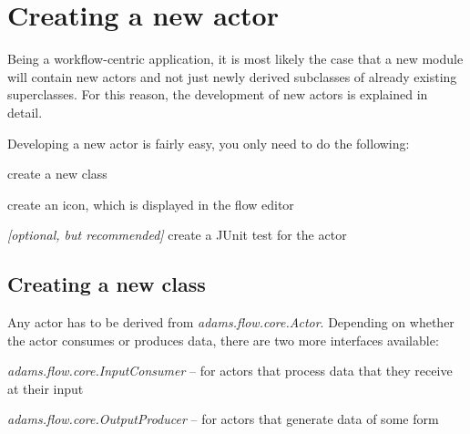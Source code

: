 \section{Creating a new actor}
Being a workflow-centric application, it is most likely the case that a new
module will contain new actors and not just newly derived subclasses of already
existing superclasses. For this reason, the development of new actors is
explained in detail.

Developing a new actor is fairly easy, you only need to do the following:
\begin{tight_itemize}
	\item create a new class
	\item create an icon, which is displayed in the flow editor
	\item \textit{[optional, but recommended]} create a JUnit test for the actor
\end{tight_itemize}

\subsection{Creating a new class}
Any actor has to be derived from \textit{adams.flow.core.Actor}.
Depending on whether the actor consumes or produces data, there are two more
interfaces available:
\begin{tight_itemize}
	\item \textit{adams.flow.core.InputConsumer} -- for actors that process data
	that they receive at their input
	\item \textit{adams.flow.core.OutputProducer} -- for actors that generate data
	of some form
\end{tight_itemize}

